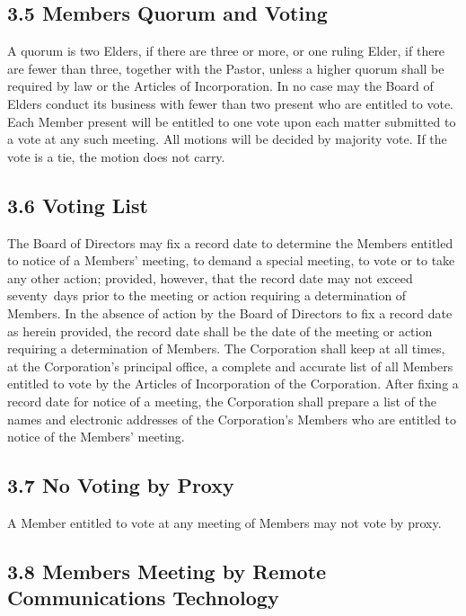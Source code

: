 \documentclass[
]{book}
\begin{document}
\subsection{3.5 Members Quorum and Voting}\label{members-quorum-and-voting}

A quorum is two Elders, if there are three or more, or one ruling Elder, if there are fewer than three, together with the Pastor, unless a higher quorum shall be required by law or the Articles of Incorporation. In no case may the Board of Elders conduct its business with fewer than two present who are entitled to vote. Each Member present will be entitled to one vote upon each matter submitted to a vote at any such meeting. All motions will be decided by majority vote. If the vote is a tie, the motion does not carry.

\subsection{3.6 Voting List}\label{voting-list}

The Board of Directors may fix a record date to determine the Members entitled to notice of a Members' meeting, to demand a special meeting, to vote or to take any other action; provided, however, that the record date may not exceed seventy~days prior to the meeting or action requiring a determination of Members. In the absence of action by the Board of Directors to fix a record date as herein provided, the record date shall be the date of the meeting or action requiring a determination of Members. The Corporation shall keep at all times, at the Corporation's principal office, a complete and accurate list of all Members entitled to vote by the Articles of Incorporation of the Corporation. After fixing a record date for notice of a meeting, the Corporation shall prepare a list of the names and electronic addresses of the Corporation's Members who are entitled to notice of the Members' meeting.

\subsection{3.7 No Voting by Proxy}\label{no-voting-by-proxy}

A Member entitled to vote at any meeting of Members may not vote by
proxy.

\subsection{3.8 Members Meeting by Remote Communications Technology}\label{members-meeting-by-remote-communications-technology}
\end{document}
